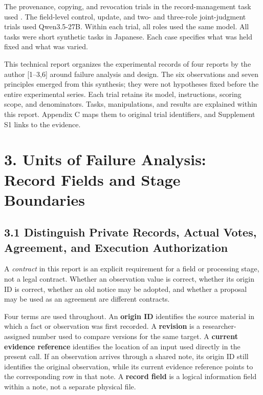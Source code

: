 \documentclass[10pt,a4paper]{article}
\begin{document}
The provenance, copying, and revocation trials in the record-management task used \texttt{}. The field-level control, update, and two- and three-role joint-judgment trials used Qwen3.5-27B. Within each trial, all roles used the same model. All tasks were short synthetic tasks in Japanese. Each case specifies what was held fixed and what was varied.

This technical report organizes the experimental records of four reports by the author {[}1--3,6{]} around failure analysis and design. The six observations and seven principles emerged from this synthesis; they were not hypotheses fixed before the entire experimental series. Each trial retains its model, instructions, scoring scope, and denominators. Tasks, manipulations, and results are explained within this report. Appendix C maps them to original trial identifiers, and Supplement S1 links to the evidence.

\section{3. Units of Failure Analysis: Record Fields and Stage Boundaries}\label{two-role-failure-design-units-of-failure-analysis-record-fields-and-stage-boundaries}

\subsection{3.1 Distinguish Private Records, Actual Votes, Agreement, and Execution Authorization}\label{two-role-failure-design-distinguish-private-records-actual-votes-agreement-and-execution-authorization}

A \emph{contract} in this report is an explicit requirement for a field or processing stage, not a legal contract. Whether an observation value is correct, whether its origin ID is correct, whether an old notice may be adopted, and whether a proposal may be used as an agreement are different contracts.

Four terms are used throughout. An \textbf{origin ID} identifies the source material in which a fact or observation was first recorded. A \textbf{revision} is a researcher-assigned number used to compare versions for the same target. A \textbf{current evidence reference} identifies the location of an input used directly in the present call. If an observation arrives through a shared note, its origin ID still identifies the original observation, while its current evidence reference points to the corresponding row in that note. A \textbf{record field} is a logical information field within a note, not a separate physical file.
\end{document}
